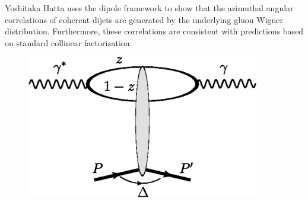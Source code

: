 Yoshitaka Hatta uses the dipole framework to show that the azimuthal angular correlations of coherent dijets are generated by the underlying gluon Wigner distribution. Furthermore, these correlations are consistent with predictions based on standard collinear factorization.

\begin{figure}[h!]
\begin{centering}
\includegraphics[width=4in]{Chapter2/importfigs/fig5_yatta_compton.png}
\par\end{centering}
\end{figure}


